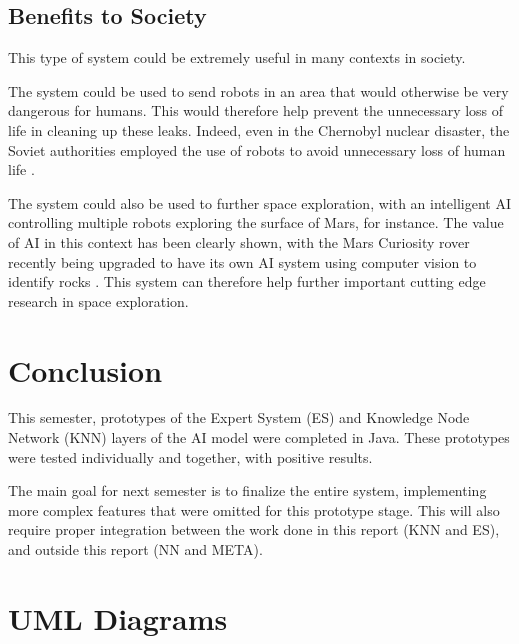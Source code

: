 \documentclass[titlepage,11pt]{article}
\begin{document}

\subsection{Benefits to Society}

This type of system could be extremely useful in many contexts in society.

The system could be used to send robots in an area that would otherwise be very dangerous for humans. This would therefore help prevent the unnecessary loss of life in cleaning up these leaks. Indeed, even in the Chernobyl nuclear disaster, the Soviet authorities employed the use of robots to avoid unnecessary loss of human life \cite{chernobyl}.

The system could also be used to further space exploration, with an intelligent AI controlling multiple robots exploring the surface of Mars, for instance. The value of AI in this context has been clearly shown, with the Mars Curiosity rover recently being upgraded to have its own AI system using computer vision to identify rocks \cite{rover}. This system can therefore help further important cutting edge research in space exploration.

\section{Conclusion}

This semester, prototypes of the Expert System (ES) and Knowledge Node Network (KNN) layers of the AI model were completed in Java. These prototypes were tested individually and together, with positive results.

The main goal for next semester is to finalize the entire system, implementing more complex features that were omitted for this prototype stage. This will also require proper integration between the work done in this report (KNN and ES), and outside this report (NN and META).

\clearpage
\onecolumn
\appendix

\renewcommand\thefigure{\thesection.\arabic{figure}}
\setcounter{figure}{0}    

\section{UML Diagrams}
\label{sec:uml}
\end{document}
